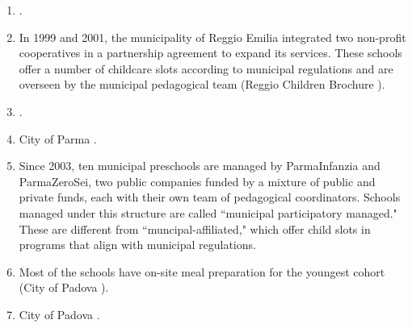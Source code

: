\begin{enumerate}
\item \citet{Rinaldi_2006_ReggioEmilia_BOOK,Giudici-Nicolosi_2014_Reggio-Approach, Cagliari-etal-eds_2016_BOOK_Loris-Malaguzzi}.
\item In 1999 and 2001, the municipality of Reggio Emilia integrated two non-profit cooperatives in a partnership agreement to expand its services. These schools offer a number of childcare slots according to municipal regulations and are overseen by the municipal pedagogical team (Reggio Children Brochure \citeyear{Reggio_Children_2008}).
\item  \citet{Giudici-Nicolosi_2014_Reggio-Approach}.
\item City of Parma \citeyearpar{Parma_Commune_2014}.
\item Since 2003, ten municipal preschools are managed by ParmaInfanzia and ParmaZeroSei, two public companies funded by a mixture of public and private funds, each with their own team of pedagogical coordinators. Schools managed under this structure are called ``municipal participatory managed." These are different from ``muncipal-affiliated," which offer child slots in programs that align with municipal regulations.
\item Most of the schools have on-site meal preparation for the youngest cohort (City of Padova \citeyear{Parma_Commune_2016}).
\item City of Padova \citeyearpar{Parma_Commune_2016}.
\end{enumerate}





